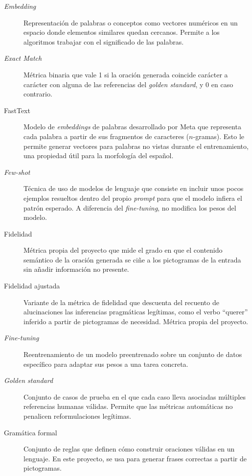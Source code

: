 \begin{description}
    \item[\textit{Embedding}] Representación de palabras o conceptos como vectores numéricos en un espacio donde elementos similares quedan cercanos. Permite a los algoritmos trabajar con el significado de las palabras.

    \item[\textit{Exact Match}] Métrica binaria que vale 1 si la oración generada coincide carácter a carácter con alguna de las referencias del \textit{golden standard}, y 0 en caso contrario.

    \item[FastText] Modelo de \textit{embeddings} de palabras desarrollado por Meta que representa cada palabra a partir de sus fragmentos de caracteres ($n$-gramas). Esto le permite generar vectores para palabras no vistas durante el entrenamiento, una propiedad útil para la morfología del español.

    \item[\textit{Few-shot}] Técnica de uso de modelos de lenguaje que consiste en incluir unos pocos ejemplos resueltos dentro del propio \textit{prompt} para que el modelo infiera el patrón esperado. A diferencia del \textit{fine-tuning}, no modifica los pesos del modelo.

    \item[Fidelidad] Métrica propia del proyecto que mide el grado en que el contenido semántico de la oración generada se ciñe a los pictogramas de la entrada sin añadir información no presente.

    \item[Fidelidad ajustada] Variante de la métrica de fidelidad que descuenta del recuento de alucinaciones las inferencias pragmáticas legítimas, como el verbo ``querer'' inferido a partir de pictogramas de necesidad. Métrica propia del proyecto.

    \item[\textit{Fine-tuning}] Reentrenamiento de un modelo preentrenado sobre un conjunto de datos específico para adaptar sus pesos a una tarea concreta.

    \item[\textit{Golden standard}] Conjunto de casos de prueba en el que cada caso lleva asociadas múltiples referencias humanas válidas. Permite que las métricas automáticas no penalicen reformulaciones legítimas.

    \item[Gramática formal] Conjunto de reglas que definen cómo construir oraciones válidas en un lenguaje. En este proyecto, se usa para generar frases correctas a partir de pictogramas.


\end{description}
